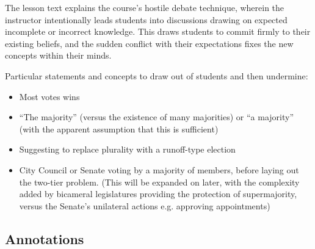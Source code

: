 The lesson text explains the course's hostile debate technique, wherein the instructor intentionally leads students into discussions drawing on expected incomplete or incorrect knowledge.  This draws students to commit firmly to their existing beliefs, and the sudden conflict with their expectations fixes the new concepts within their minds.

Particular statements and concepts to draw out of students and then undermine:

\begin{itemize}
    \item Most votes wins

    \item ``The majority'' (versus the existence of many majorities) or ``a majority'' (with the apparent assumption that this is sufficient)

    \item Suggesting to replace plurality with a runoff-type election

    \item City Council or Senate voting by a majority of members, before laying out the two-tier problem. (This will be expanded on later, with the complexity added by bicameral legislatures providing the protection of supermajority, versus the Senate's unilateral actions e.g. approving appointments)
\end{itemize}

\subsection{Annotations}


